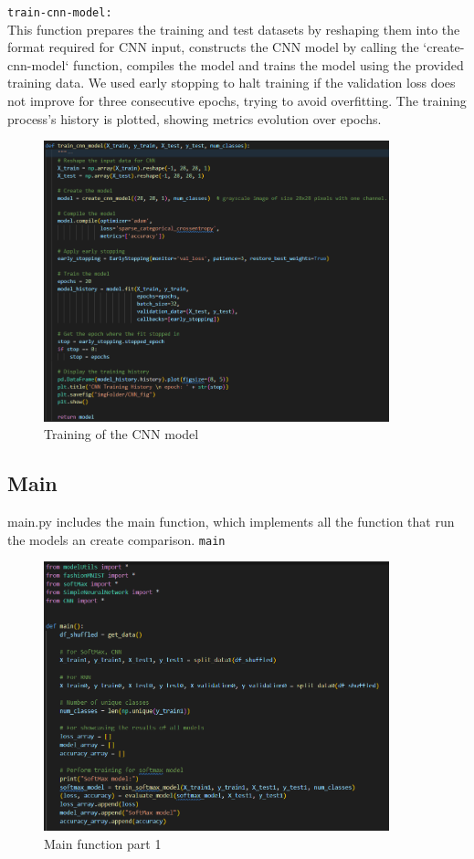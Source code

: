 \documentclass{article}
\newcommand{\code}[1]{\colorbox{light-gray}{\texttt{#1}}}
\begin{document}
\code{train-cnn-model:}\\\newline
This function prepares the training and test datasets by reshaping them into the format
required for CNN input, constructs the CNN model by calling the `create-cnn-model` function,
compiles the model and trains the model using the provided training data.
We used early stopping to halt training if the validation loss does not improve for three consecutive epochs,
trying to avoid overfitting.
The training process's history is plotted, showing metrics evolution over epochs.
\begin{figure}[H]
    \caption{Training of the CNN model}
    \centering
    \includegraphics[width=10cm]{../imgFolder/train_cnn_model.png}
\end{figure}

\subsection{Main}
main.py includes the main function, which implements all the function that run the models an create comparison.
\code{main}
\begin{figure}[H]
    \caption{Main function part 1}
    \centering
    \includegraphics[width=10cm]{../imgFolder/mainPart1.png}
\end{figure}
\end{document}
